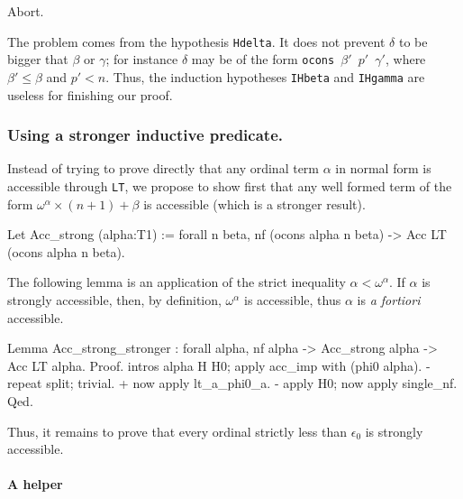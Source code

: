\begin{Coqbad}
  Abort.
\end{Coqbad}

The problem comes from the hypothesis \texttt{Hdelta}. It does not prevent  \(\delta\) to be bigger that \(\beta\) or
\(\gamma\);
for instance \(\delta\) may be of the form
\texttt{ocons $\beta'$ $p'$  $\gamma'$},
where  \(\beta' \leq  \beta\) and  \(p' < n\).
Thus, the induction hypotheses \texttt{IHbeta} and \texttt{IHgamma}  are useless for finishing our proof.

\subsubsection{Using a stronger inductive predicate.}
\label{sec:orgheadline78}
  Instead of trying to prove directly that any ordinal term \(\alpha\) in normal form is accessible
through \texttt{LT}, we propose to show first that any well formed 
term of the form \(\omega^\alpha\times(n+1)+\beta\) is accessible (which is a stronger result).

\begin{Coqsrc}
 Let Acc_strong (alpha:T1) :=
      forall n beta, 
        nf (ocons alpha n beta) -> Acc LT (ocons alpha  n beta).
\end{Coqsrc}

The following lemma is an application of the strict inequality 
$\alpha < \omega ^\alpha$. If $\alpha$ is strongly accessible, then, by definition,
$\omega^\alpha$ is accessible, thus $\alpha$ is \emph{a fortiori} accessible.

\begin{Coqsrc}
 Lemma Acc_strong_stronger : forall alpha, 
     nf alpha -> Acc_strong  alpha -> Acc LT  alpha.
 Proof.
  intros alpha H H0; apply acc_imp with (phi0 alpha).
  - repeat split; trivial.
    + now apply lt_a_phi0_a.
  -  apply H0;  now apply single_nf.
Qed.
\end{Coqsrc}

Thus, it remains to prove that every ordinal strictly less than $\epsilon_0$
is strongly accessible.


\label{sec:orgheadline81}
\label{proof-wf-epsilon0}
\paragraph{A helper}
\label{sec:orgheadline79}

